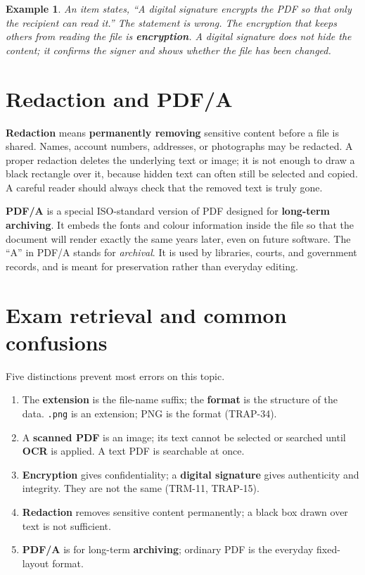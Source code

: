 \documentclass[11pt]{article}
\newtheorem{example}{Example}[section]
\begin{document}
\begin{example}
An item states, ``A digital signature encrypts the PDF so that only the
recipient can read it.'' The statement is wrong. The encryption that keeps
others from reading the file is \textbf{encryption}. A digital signature does
not hide the content; it confirms the signer and shows whether the file has
been changed.
\end{example}

\section{Redaction and PDF/A}
\textbf{Redaction} means \textbf{permanently removing} sensitive content
before a file is shared. Names, account numbers, addresses, or photographs
may be redacted. A proper redaction deletes the underlying text or image; it
is not enough to draw a black rectangle over it, because hidden text can
often still be selected and copied. A careful reader should always check that
the removed text is truly gone.

\textbf{PDF/A} is a special ISO-standard version of PDF designed for
\textbf{long-term archiving}. It embeds the fonts and colour information
inside the file so that the document will render exactly the same years later,
even on future software. The ``A'' in PDF/A stands for \emph{archival}. It is
used by libraries, courts, and government records, and is meant for
preservation rather than everyday editing.

\section{Exam retrieval and common confusions}
Five distinctions prevent most errors on this topic.
\begin{enumerate}
  \item The \textbf{extension} is the file-name suffix; the \textbf{format}
    is the structure of the data. \texttt{.png} is an extension; PNG is the
    format (TRAP-34).
  \item A \textbf{scanned PDF} is an image; its text cannot be selected or
    searched until \textbf{OCR} is applied. A text PDF is searchable at once.
  \item \textbf{Encryption} gives confidentiality; a \textbf{digital
    signature} gives authenticity and integrity. They are not the same
    (TRM-11, TRAP-15).
  \item \textbf{Redaction} removes sensitive content permanently; a black
    box drawn over text is not sufficient.
  \item \textbf{PDF/A} is for long-term \textbf{archiving}; ordinary PDF is
    the everyday fixed-layout format.
\end{enumerate}
\end{document}
